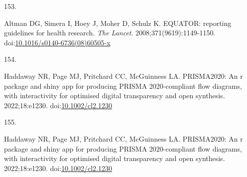 \documentclass[
]{book}
\newlength{\cslhangindent}
\newlength{\csllabelwidth}
\newlength{\cslentryspacingunit} %
\newenvironment{CSLReferences}[2] %
 {%
  \setlength{\parindent}{0pt}
  \ifodd #1
  \let\oldpar\par
  \def\par{\hangindent=\cslhangindent\oldpar}
  \fi
  \setlength{\parskip}{#2\cslentryspacingunit}
 }%
 {}
\newcommand{\CSLLeftMargin}[1]{\parbox[t]{\csllabelwidth}{#1}}
\newcommand{\CSLRightInline}[1]{\parbox[t]{\linewidth - \csllabelwidth}{#1}\break}
\begin{document}
\begin{CSLReferences}{0}{0}
\leavevmode{}%
\CSLLeftMargin{153. }%
\CSLRightInline{Altman DG, Simera I, Hoey J, Moher D, Schulz K. EQUATOR: reporting guidelines for health research. \emph{The Lancet}. 2008;371(9619):1149-1150. doi:\href{https://doi.org/10.1016/s0140-6736(08)60505-x}{10.1016/s0140-6736(08)60505-x}}

\leavevmode{}%
\CSLLeftMargin{154. }%
\CSLRightInline{Haddaway NR, Page MJ, Pritchard CC, McGuinness LA. PRISMA2020: An r package and shiny app for producing PRISMA 2020-compliant flow diagrams, with interactivity for optimised digital transparency and open synthesis. 2022;18:e1230. doi:\href{https://doi.org/10.1002/cl2.1230}{10.1002/cl2.1230}}

\leavevmode{}%
\CSLLeftMargin{155. }%
\CSLRightInline{Haddaway NR, Page MJ, Pritchard CC, McGuinness LA. PRISMA2020: An r package and shiny app for producing PRISMA 2020-compliant flow diagrams, with interactivity for optimised digital transparency and open synthesis. 2022;18:e1230. doi:\href{https://doi.org/10.1002/cl2.1230}{10.1002/cl2.1230}}

\end{CSLReferences}

\newpage

\backmatter


\end{document}
